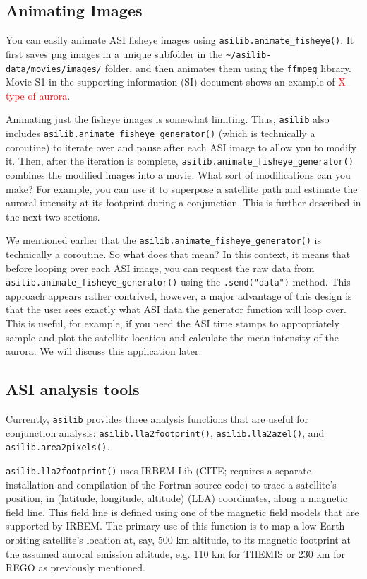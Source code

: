 \documentclass[draft]{agujournal2019}
\begin{document}
\subsection{Animating Images}
You can easily animate ASI fisheye images using \verb|asilib.animate_fisheye()|. It first saves png images in a unique subfolder in the \verb|~/asilib-data/movies/images/| folder, and then animates them using the \verb|ffmpeg| library. Movie S1 in the supporting information (SI) document shows an example of \textcolor{red}{X type of aurora}.

Animating just the fisheye images is somewhat limiting. Thus, \verb|asilib| also includes \verb|asilib.animate_fisheye_generator()| (which is technically a coroutine) to iterate over and pause after each ASI image to allow you to modify it. Then, after the iteration is complete, \verb|asilib.animate_fisheye_generator()| combines the modified images into a movie. What sort of modifications can you make? For example, you can use it to superpose a satellite path and estimate the auroral intensity at its footprint during a conjunction. This is further described in the next two sections. 

We mentioned earlier that the \verb|asilib.animate_fisheye_generator()| is technically a coroutine. So what does that mean? In this context, it means that before looping over each ASI image, you can request the raw data from \verb|asilib.animate_fisheye_generator()| using the \verb|.send("data")| method. This approach appears rather contrived, however, a major advantage of this design is that the user sees exactly what ASI data the generator function will loop over. This is useful, for example, if you need the ASI time stamps to appropriately sample and plot the satellite location and calculate the mean intensity of the aurora. We will discuss this application later.

\subsection{ASI analysis tools}
Currently, \verb|asilib| provides three analysis functions that are useful for conjunction analysis: \verb|asilib.lla2footprint()|, \verb|asilib.lla2azel()|, and \verb|asilib.area2pixels()|.

\verb|asilib.lla2footprint()| uses IRBEM-Lib (CITE; requires a separate installation and compilation of the Fortran source code) to trace a satellite's position, in (latitude, longitude, altitude) (LLA) coordinates, along a magnetic field line. This field line is defined using one of the magnetic field models that are supported by IRBEM. The primary use of this function is to map a low Earth orbiting satellite's location at, say, 500 km altitude, to its magnetic footprint at the assumed auroral emission altitude, e.g. 110 km for THEMIS or 230 km for REGO as previously mentioned.
\end{document}
